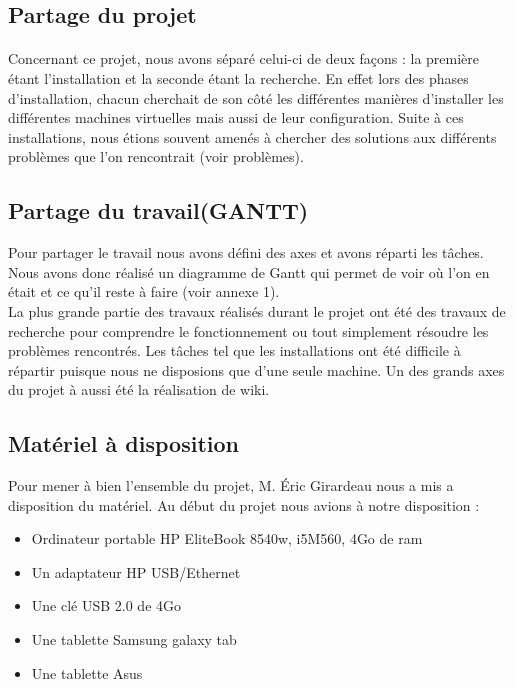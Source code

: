 \documentclass[a4paper,12pt]{extarticle}
\begin{document}
\subsection{Partage du projet}

\paragraph{}
Concernant ce projet, nous avons séparé celui-ci de deux façons : la première étant l’installation et la seconde étant la recherche. En effet lors des phases d’installation, 
chacun cherchait de son côté les différentes manières d’installer les différentes machines virtuelles mais aussi de leur configuration. Suite à ces installations, nous étions souvent amenés à chercher des solutions aux différents problèmes que l’on rencontrait (voir problèmes).

\subsection{Partage du travail(GANTT)}

Pour partager le travail nous avons défini des axes et avons réparti les tâches. Nous avons donc réalisé un diagramme de Gantt qui permet de voir où l’on en était et ce qu’il reste à faire (voir annexe 1).\\
La plus grande partie des travaux réalisés durant le projet ont été des travaux de recherche pour comprendre le fonctionnement ou tout simplement résoudre les problèmes rencontrés. 
Les tâches tel que les installations ont été difficile à répartir puisque nous ne disposions que d'une seule machine. Un des grands axes du projet à aussi été la réalisation de wiki.

\subsection{Matériel à disposition}

Pour mener à bien l’ensemble du projet, M. Éric Girardeau nous a mis a disposition du matériel. Au début du projet nous avions à notre disposition :
\begin{itemize}
\item Ordinateur portable HP EliteBook 8540w, i5M560, 4Go de ram
\item Un adaptateur HP USB/Ethernet
\item Une clé USB 2.0 de 4Go
\item Une tablette Samsung galaxy tab
\item Une tablette Asus\\
\end{itemize}
\end{document}
